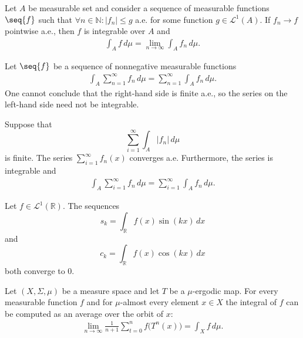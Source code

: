     \begin{theorem}\label{lebesgue:dominated_convergence_theorem}
        Let $A$ be measurable set and consider a sequence of measurable functions $\seq{f}$ such that $\forall n\in\mathbb{N}:|f_n|\leq g$ a.e. for some function $g\in\mathcal{L}^1(A)$. If $f_n\rightarrow f$ pointwise a.e., then $f$ is integrable over $A$ and
        \begin{gather}
            \int_Af\,d\mu = \lim_{n\rightarrow\infty}\int_Af_n\,d\mu.
        \end{gather}
    \end{theorem}

    \begin{property}
        Let $\seq{f}$ be a sequence of nonnegative measurable functions
        \begin{gather}
            \int_A\sum_{n=1}^\infty f_n\,d\mu = \sum_{n=1}^\infty\int_Af_n\,d\mu.
        \end{gather}
        One cannot conclude that the right-hand side is finite a.e., so the series on the left-hand side need not be integrable.
    \end{property}

    \begin{theorem}\label{lebesgue:beppo_levi}
        Suppose that \[\sum_{i=1}^\infty\int_A|f_n|\,d\mu\] is finite. The series $\sum_{i=1}^\infty f_n(x)$ converges a.e. Furthermore, the series is integrable and
        \begin{gather}
            \int_A\sum_{i=1}^\infty f_n\,d\mu = \sum_{i=1}^\infty\int_Af_n\,d\mu.
        \end{gather}
    \end{theorem}

    \begin{theorem}\label{lebesgue:riemann_lebesue_lemma}
        Let $f\in\mathcal{L}^1(\mathbb{R})$. The sequences \[s_k = \int_\mathbb{R}f(x)\sin(kx)\,dx\] and \[c_k = \int_\mathbb{R}f(x)\cos(kx)\,dx\] both converge to 0.
    \end{theorem}

    \begin{theorem}\label{lebesgue:ergodic}
        Let $(X,\Sigma,\mu)$ be a measure space and let $T$ be a $\mu$-ergodic map. For every measurable function $f$ and for $\mu$-almost every element $x\in X$ the integral of $f$ can be computed as an average over the orbit of $x$:
        \begin{gather}
            \lim_{n\rightarrow\infty}\frac{1}{n+1}\sum_{t=0}^nf\big(T^n(x)\big) = \int_Xf\,d\mu.
        \end{gather}
    \end{theorem}

